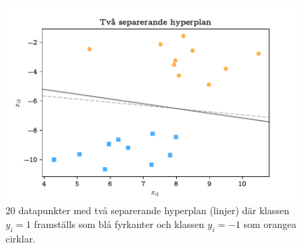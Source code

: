 \documentclass[a4paper, 12pt]{report}
\theoremstyle{definition}
\theoremstyle{remark}
\begin{document}
\begin{figure}[h]
\centering
\includegraphics[width=0.8\linewidth, trim={0.5cm 2mm 0.5cm 6mm}, clip]{KandFigur1.pdf}
\caption{\label{fig:separatinghyperplane}20 datapunkter med två separerande hyperplan (linjer) där klassen $y_i=1$ framställs som blå fyrkanter och klassen $y_i=-1$ som orangea cirklar.}
\end{figure}
\end{document}
